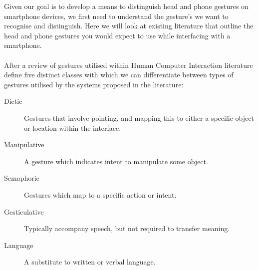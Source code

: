 


Given our goal is to develop a means to distinguish head and phone gestures on smartphone devices, we first need to understand the gesture's we want to recognise and distinguish.
Here we will look at existing literature that outline the head and phone gestures you would expect to use while interfacing with a smartphone.
\\\\
%
After a review of gestures utilised within Human Computer Interaction literature \citeauthor{karam2005taxonomy} define five distinct classes with which we can differentiate between types of gestures utilised by the systems proposed in the literature\cite{karam2005taxonomy}:
\begin{description}
    \item[Dietic] Gestures that involve pointing, and mapping this to either a specific object or location within the interface.
    \item[Manipulative] A gesture which indicates intent to manipulate some object.
    \item[Semaphoric] Gestures which map to a specific action or intent.
    \item[Gesticulative] Typically accompany speech, but not required to transfer meaning.
    \item[Language] A substitute to written or verbal language.
\end{description}

